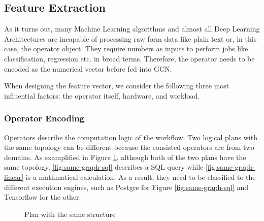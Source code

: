 \subsection{Feature Extraction}
As it turns out, many Machine Learning algorithms and almost all Deep Learning Architectures are incapable of processing raw form data like plain text or, in this case, the operator object. 
They require numbers as inputs to perform jobs like classification, regression etc. in broad terms. 
Therefore, the operator needs to be encoded as the numerical vector before fed into GCN.

When designing the feature vector, we consider the following three most influential factors: the operator itself, hardware, and workload.

\subsubsection{Operator Encoding}
Operators describe the computation logic of the workflow.
Two logical plans with the same topology can be different because the consisted operators are from two domains.
As examplified in Figure \ref{fig:graph-comparison}, although both of the two plans have the same topology,
\ref{fig:same-graph-sql} describes a SQL query while \ref{fig:same-graph-linear} is a mathmatical calculation.
As a result, they need to be classified to the different execution engines, such as Postgre for Figure \ref{fig:same-graph-sql} and Tensorflow for the other.

\begin{figure}
  \caption{Plan with the same structure}
  \label{fig:graph-comparison}
\end{figure}

